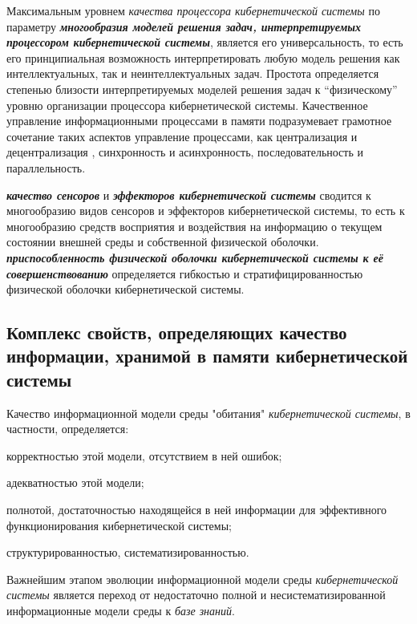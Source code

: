 Максимальным уровнем \textit{качества процессора кибернетической системы} по параметру \textbf{\textit{многообразия \textit{моделей решения задач}, интерпретируемых \textit{процессором кибернетической системы}}}, является его универсальность, то есть его принципиальная возможность интерпретировать любую модель решения как интеллектуальных, так и неинтеллектуальных задач. 
Простота определяется степенью близости интерпретируемых моделей решения задач к “физическому” уровню организации процессора кибернетической системы. 
Качественное управление информационными процессами в памяти подразумевает грамотное сочетание таких аспектов управление процессами, как централизация и децентрализация , синхронность и асинхронность, последовательность и параллельность.

\textbf{\textit{качество сенсоров}} и \textbf{\textit{эффекторов кибернетической системы}} сводится к многообразию видов сенсоров и эффекторов кибернетической системы, то есть к многообразию средств восприятия и воздействия на информацию о текущем состоянии внешней среды и собственной физической оболочки.
\textbf{\textit{приспособленность физической оболочки кибернетической системы к её совершенствованию}} определяется гибкостью и стратифицированностью физической оболочки кибернетической системы.

\subsection{Комплекс свойств, определяющих качество информации, хранимой в памяти кибернетической системы}
{\label{sec_cyb_syst_information_quality}} 

Качество информационной модели среды "обитания"{} \textit{кибернетической системы}, в частности, определяется:
\begin{textitemize}
    \item корректностью этой модели, отсутствием в ней ошибок;
    \item адекватностью этой модели;
    \item полнотой, достаточностью находящейся в ней информации для эффективного функционирования кибернетической системы;
    \item структурированностью, систематизированностью.
\end{textitemize}

Важнейшим этапом эволюции информационной модели среды \textit{кибернетической системы} является переход от недостаточно полной и несистематизированной информационные модели среды к \textit{базе знаний}.

